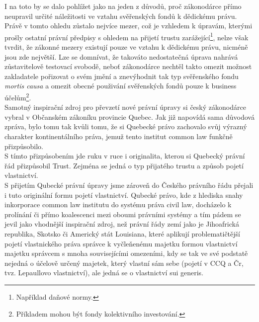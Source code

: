 \documentclass{article}
\begin{document}
I na toto by se dalo pohlížet jako na jeden z důvodů, proč zákonodárce přímo neupravil určité náležitosti ve vztahu svěřenských fondů k dědickému právu. Právě v tomto ohledu zůstalo nejvíce mezer, což je vzhledem k úpravám, kterými prošly ostatní právní předpisy s ohledem na přijetí trustu zarážející\footnote{Například daňové normy.}, nelze však tvrdit, že zákonné mezery existují pouze ve vztahu k dědickému právu, nicméně jsou zde největší. Lze se domnívat, že takováto nedostatečná úprava nahrává zůstavitelově testovací svobodě, neboť zákonodárce nechtěl takto omezit možnost zakladatele pořizovat o svém jmění a znevýhodnit tak typ svěřenského fondu \textit{mortis causa} a omezit obecné použivání svěřenských fondů pouze k business účelům\footnote{Příkladem mohou být fondy kolektivního investování.}.\\

Samotný inspirační zdroj pro převzetí nové právní úpravy si český zákonodárce vybral v Občanském zákoníku provincie Quebec. Jak již napovídá sama důvodová zpráva, bylo tomu tak kvůli tomu, že si Quebecké právo zachovalo svůj výrazný charakter kontinentálního práva, jemuž tento institut common law funkčně přizpůsobilo.\\

S tímto přizpůsobením jde ruku v ruce i originalita, kterou si Quebecký právní řád přizpůsobil Trust. Zejména se jedná o typ přijatého trustu a způsob pojetí vlastnictví.\\

S přijetím Qubecké právní úpravy jsme zároveň do Českého právního řádu přejali i tuto originální formu pojetí vlastnictví. Qubecké právo, kde z hlediska snahy inkorporace common law institutu do systému práva civil law, docházelo k prolínání či přímo koalescenci mezi oboumi právními systémy a tím pádem se jevil jako vhodnější inspirační zdroj, než právní řády zemí jako je Jihoafrická republika, Skotsko či Americký stát Louisiana, které aplikují problematičtější pojetí vlastnického práva správce k vyčleňenému majetku formou vlastnictví majetku správcem s mnoha souvisejícími omezeními, kdy se tak ve své podstatě nejedná o účelově určený majetek, který vlastní sám sebe (pojetí v CCQ a Čr, tvz. Lepaullovo vlastnictví), ale jedná se o vlastnictví sui generis.\\

\end{document}
